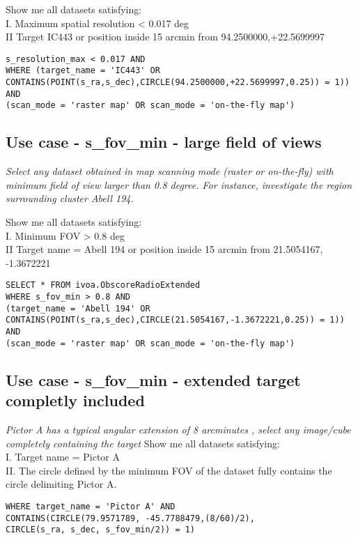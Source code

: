 Show me all datasets satisfying: \\
I. Maximum spatial resolution < 0.017 deg \\
II Target IC443 or position inside 15 arcmin from 94.2500000,+22.5699997 \\

\begin{verbatim}
s_resolution_max < 0.017 AND
WHERE (target_name = 'IC443' OR
CONTAINS(POINT(s_ra,s_dec),CIRCLE(94.2500000,+22.5699997,0.25)) = 1)) AND
(scan_mode = 'raster map' OR scan_mode = 'on-the-fly map')
\end{verbatim}

\subsection{Use case - s\_fov\_min - large field of views}
\label{sec:s_fov_min}
\textit{Select any dataset obtained in map scanning mode (raster or on-the-fly) with minimum field of view larger than 0.8 degree. For instance, investigate the region surrounding cluster Abell 194.}

Show me all datasets satisfying:\\
I. Minimum FOV > 0.8 deg \\
II Target name = Abell 194 or position inside 15 arcmin from 21.5054167, -1.3672221 \\
\begin{verbatim}
SELECT * FROM ivoa.ObscoreRadioExtended
WHERE s_fov_min > 0.8 AND
(target_name = 'Abell 194' OR
CONTAINS(POINT(s_ra,s_dec),CIRCLE(21.5054167,-1.3672221,0.25)) = 1)) AND
(scan_mode = 'raster map' OR scan_mode = 'on-the-fly map')
\end{verbatim}

\subsection{Use case - s\_fov\_min - extended target completly included}
\label{sec:s_fov_max}
\textit{Pictor A has a typical angular extension  of 8 arcminutes , select any image/cube completely containing the target}
Show me all datasets satisfying: \\
I. Target name = Pictor A \\
II. The circle defined by the minimum FOV of the dataset fully contains the circle delimiting Pictor A. \\
\begin{verbatim}
WHERE target_name = 'Pictor A' AND
CONTAINS(CIRCLE(79.9571789, -45.7788479,(8/60)/2),
CIRCLE(s_ra, s_dec, s_fov_min/2)) = 1)
\end{verbatim}

